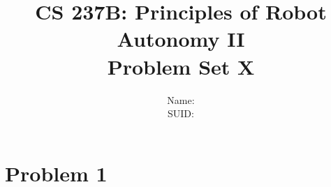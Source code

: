 \documentclass{article}
\title{CS 237B: Principles of Robot Autonomy II \\ Problem Set X}
\author{Name:      \\ SUID:}
\date{}
\begin{document}
\maketitle
\pagestyle{fancy} 




\section*{Problem 1}
\end{document}
